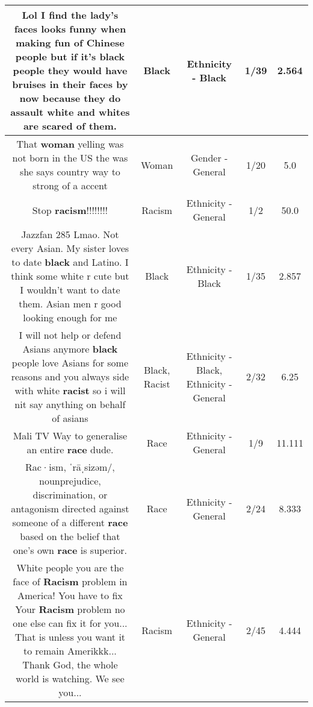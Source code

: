 \documentclass[11pt]{article}
\newlength\mylength
\begin{document}
\begin{center}
\begin{longtable}{|C{.65\mylength}|C{.30\mylength}|C{.12\mylength}|C{.12\mylength}|C{.12\mylength}|}
  \small Lol I find the lady's faces looks funny when making fun of Chinese people but if it's \textbf{black} people they would have bruises in their faces by now because they do assault white and whites are scared of them.\normalsize   & Black & Ethnicity - Black & 1/39 & 2.564 \\  \hline
  \small That \textbf{woman}  yelling was not born  in  the US  the was she says country  way to strong  of a accent\normalsize   & Woman & Gender - General & 1/20 & 5.0 \\  \hline
  \small Stop \textbf{racism}!!!!!!!!\normalsize   & Racism & Ethnicity - General & 1/2 & 50.0 \\  \hline
  \small Jazzfan 285  Lmao. Not every Asian. My sister loves to date \textbf{black} and Latino. I think some white r cute but I wouldn't want to date them. Asian men r good looking enough for me\normalsize   & Black & Ethnicity - Black & 1/35 & 2.857 \\  \hline
  \small I will not help or defend Asians anymore \textbf{black} people love Asians for some reasons and you always side with white \textbf{racist} so i will nit say anything on behalf of asians\normalsize   & Black, Racist & Ethnicity - Black, Ethnicity - General & 2/32 & 6.25 \\  \hline
  \small Mali TV Way to generalise an entire \textbf{race} dude.\normalsize   & Race & Ethnicity - General & 1/9 & 11.111 \\  \hline
  \small Rac·ism, ˈrāˌsizəm/, nounprejudice, discrimination, or antagonism directed against someone of a different \textbf{race} based on the belief that one's own \textbf{race} is superior.\normalsize   & Race & Ethnicity - General & 2/24 & 8.333 \\  \hline
  \small White people you are the face of \textbf{Racism} problem in America! You have to fix Your \textbf{Racism} problem no one else can fix it for you... That is unless you want it to remain Amerikkk... Thank God, the whole world is watching. We see you...\normalsize   & Racism & Ethnicity - General & 2/45 & 4.444 \\  \hline

\end{longtable}
\end{center}
\end{document}

